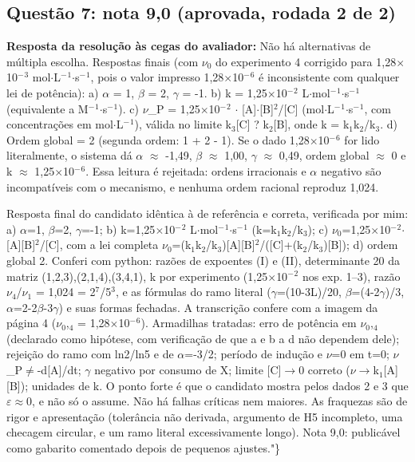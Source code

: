 \documentclass{article}%
\begin{document}
\subsection*{Questão 7: nota 9,0 (aprovada, rodada 2 de 2)}%
\textbf{Resposta da resolução às cegas do avaliador:} Não há alternativas de múltipla escolha. Respostas finais (com $\nu$$_{0}$ do experimento 4 corrigido para 1,28$\times$10$^{-}$$^3$ mol$\cdot$L$^{-}$$^{1}$$\cdot$s$^{-}$$^{1}$, pois o valor impresso 1,28$\times$10$^{-}$$^{6}$ é inconsistente com qualquer lei de potência):\newline%
\newline%
a) $\alpha$ = 1, $\beta$ = 2, $\gamma$ = -1.\newline%
b) k = 1,25$\times$10$^{-}$$^2$ L$\cdot$mol$^{-}$$^{1}$$\cdot$s$^{-}$$^{1}$ (equivalente a M$^{-}$$^{1}$$\cdot$s$^{-}$$^{1}$).\newline%
c) $\nu$\_P = 1,25$\times$10$^{-}$$^2$ $\cdot$ {[}A{]}$\cdot${[}B{]}$^2$/{[}C{]} (mol$\cdot$L$^{-}$$^{1}$$\cdot$s$^{-}$$^{1}$, com concentrações em mol$\cdot$L$^{-}$$^{1}$), válida no limite k$_{3}${[}C{]} ? k$_{2}${[}B{]}, onde k = k$_{1}$k$_{2}$/k$_{3}$.\newline%
d) Ordem global = 2 (segunda ordem: 1 + 2 - 1).\newline%
\newline%
Se o dado 1,28$\times$10$^{-}$$^{6}$ for lido literalmente, o sistema dá $\alpha$ $\approx$ -1,49, $\beta$ $\approx$ 1,00, $\gamma$ $\approx$ 0,49, ordem global $\approx$ 0 e k $\approx$ 1,25$\times$10$^{-}$$^{6}$. Essa leitura é rejeitada: ordens irracionais e $\alpha$ negativo são incompatíveis com o mecanismo, e nenhuma ordem racional reproduz 1,024.\par %
Resposta final do candidato idêntica à de referência e correta, verificada por mim: a) $\alpha$=1, $\beta$=2, $\gamma$=-1; b) k=1,25$\times$10$^{-}$$^2$ L$\cdot$mol$^{-}$$^{1}$$\cdot$s$^{-}$$^{1}$ (k=k$_{1}$k$_{2}$/k$_{3}$); c) $\nu$$_{0}$=1,25$\times$10$^{-}$$^2$$\cdot${[}A{]}{[}B{]}$^2$/{[}C{]}, com a lei completa $\nu$$_{0}$=(k$_{1}$k$_{2}$/k$_{3}$){[}A{]}{[}B{]}$^2$/({[}C{]}+(k$_{2}$/k$_{3}$){[}B{]}); d) ordem global 2. Conferi com python: razões de expoentes (I) e (II), determinante 20 da matriz (1,2,3),(2,1,4),(3,4,1), k por experimento (1,25$\times$10$^{-}$$^2$ nos exp. 1--3), razão $\nu$$_{4}$/$\nu$$_{1}$ = 1,024 = 2$^{7}$/5$^3$, e as fórmulas do ramo literal ($\gamma$=(10-3L)/20, $\beta$=(4-2$\gamma$)/3, $\alpha$=2-2$\beta$-3$\gamma$) e suas formas fechadas. A transcrição confere com a imagem da página 4 ($\nu$$_{0}$,$_{4}$ = 1,28$\times$10$^{-}$$^{6}$). Armadilhas tratadas: erro de potência em $\nu$$_{0}$,$_{4}$ (declarado como hipótese, com verificação de que a e b a d não dependem dele); rejeição do ramo com ln2/ln5 e de $\alpha$=-3/2; período de indução e $\nu$=0 em t=0; $\nu$\_P$\neq$-d{[}A{]}/dt; $\gamma$ negativo por consumo de X; limite {[}C{]}$\to$0 correto ($\nu$$\to$k$_{1}${[}A{]}{[}B{]}); unidades de k. O ponto forte é que o candidato mostra pelos dados 2 e 3 que $\varepsilon$$\approx$0, e não só o assume. Não há falhas críticas nem maiores. As fraquezas são de rigor e apresentação (tolerância não derivada, argumento de H5 incompleto, uma checagem circular, e um ramo literal excessivamente longo). Nota 9,0: publicável como gabarito comentado depois de pequenos ajustes."\}%
\end{document}
